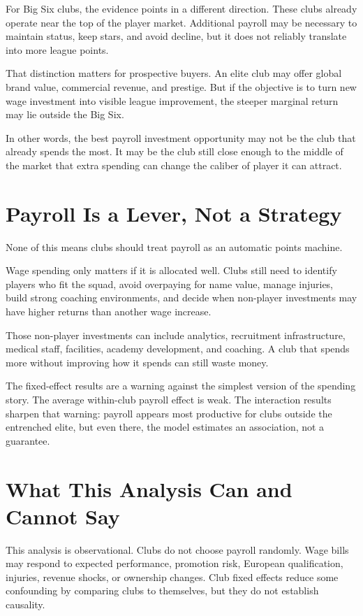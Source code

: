 \documentclass[12pt]{article}
\begin{document}
For Big Six clubs, the evidence points in a different direction. These clubs already operate near the top of the player market. Additional payroll may be necessary to maintain status, keep stars, and avoid decline, but it does not reliably translate into more league points.

That distinction matters for prospective buyers. An elite club may offer global brand value, commercial revenue, and prestige. But if the objective is to turn new wage investment into visible league improvement, the steeper marginal return may lie outside the Big Six.

In other words, the best payroll investment opportunity may not be the club that already spends the most. It may be the club still close enough to the middle of the market that extra spending can change the caliber of player it can attract.

\section{Payroll Is a Lever, Not a Strategy}

None of this means clubs should treat payroll as an automatic points machine.

Wage spending only matters if it is allocated well. Clubs still need to identify players who fit the squad, avoid overpaying for name value, manage injuries, build strong coaching environments, and decide when non-player investments may have higher returns than another wage increase.

Those non-player investments can include analytics, recruitment infrastructure, medical staff, facilities, academy development, and coaching. A club that spends more without improving how it spends can still waste money.

The fixed-effect results are a warning against the simplest version of the spending story. The average within-club payroll effect is weak. The interaction results sharpen that warning: payroll appears most productive for clubs outside the entrenched elite, but even there, the model estimates an association, not a guarantee.

\section{What This Analysis Can and Cannot Say}

This analysis is observational. Clubs do not choose payroll randomly. Wage bills may respond to expected performance, promotion risk, European qualification, injuries, revenue shocks, or ownership changes. Club fixed effects reduce some confounding by comparing clubs to themselves, but they do not establish causality.
\end{document}
